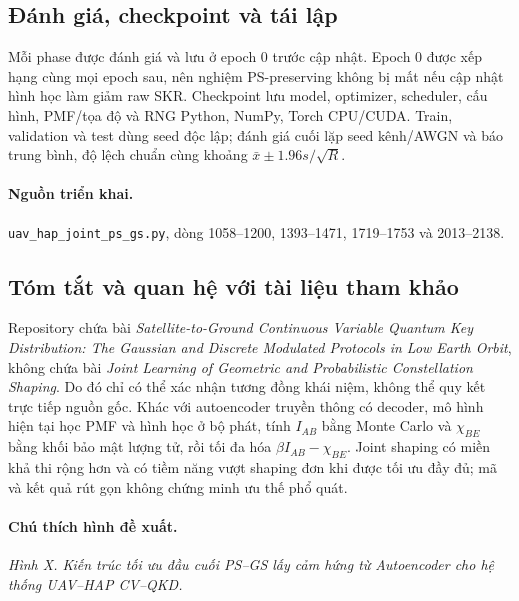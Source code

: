\subsection{Đánh giá, checkpoint và tái lập}

Mỗi phase được đánh giá và lưu ở epoch 0 trước cập nhật. Epoch 0 được xếp hạng cùng mọi epoch sau, nên nghiệm PS-preserving không bị mất nếu cập nhật hình học làm giảm raw SKR. Checkpoint lưu model, optimizer, scheduler, cấu hình, PMF/tọa độ và RNG Python, NumPy, Torch CPU/CUDA. Train, validation và test dùng seed độc lập; đánh giá cuối lặp seed kênh/AWGN và báo trung bình, độ lệch chuẩn cùng khoảng \(\bar x\pm1.96s/\sqrt R\).

\paragraph{Nguồn triển khai.} \texttt{uav\_hap\_joint\_ps\_gs.py}, dòng 1058--1200, 1393--1471, 1719--1753 và 2013--2138.

\subsection{Tóm tắt và quan hệ với tài liệu tham khảo}

Repository chứa bài \emph{Satellite-to-Ground Continuous Variable Quantum Key Distribution: The Gaussian and Discrete Modulated Protocols in Low Earth Orbit}, không chứa bài \emph{Joint Learning of Geometric and Probabilistic Constellation Shaping}. Do đó chỉ có thể xác nhận tương đồng khái niệm, không thể quy kết trực tiếp nguồn gốc. Khác với autoencoder truyền thông có decoder, mô hình hiện tại học PMF và hình học ở bộ phát, tính \(I_{AB}\) bằng Monte Carlo và \(\chi_{BE}\) bằng khối bảo mật lượng tử, rồi tối đa hóa \(\beta I_{AB}-\chi_{BE}\). Joint shaping có miền khả thi rộng hơn và có tiềm năng vượt shaping đơn khi được tối ưu đầy đủ; mã và kết quả rút gọn không chứng minh ưu thế phổ quát.

\paragraph{Chú thích hình đề xuất.} \emph{Hình X. Kiến trúc tối ưu đầu cuối PS--GS lấy cảm hứng từ Autoencoder cho hệ thống UAV--HAP CV--QKD.}
